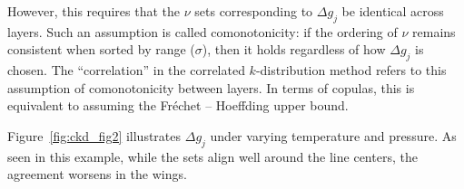 However, this requires that the $\nu$ sets corresponding to $\Delta g_j$ be identical across layers.  
Such an assumption is called comonotonicity: if the ordering of $\nu$ remains consistent when sorted by range ($\sigma$), then it holds regardless of how $\Delta g_j$ is chosen.  
The ``correlation'' in the correlated $k$-distribution method refers to this assumption of comonotonicity between layers.  
In terms of copulas, this is equivalent to assuming the Fréchet -- Hoeffding upper bound.

Figure~\ref{fig:ckd_fig2} illustrates $\Delta g_j$ under varying temperature and pressure.  
As seen in this example, while the sets align well around the line centers, the agreement worsens in the wings.
